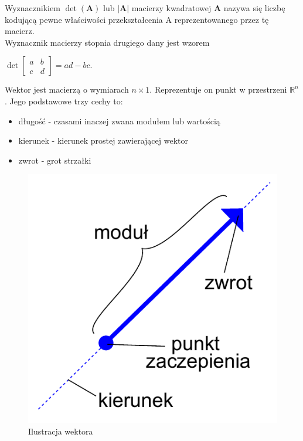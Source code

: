\documentclass[a4paper,12pt,oneside]{book}
\begin{document}
	Wyznacznikiem $\det(\mathbf {A} )$ lub $|\mathbf {A} |$ macierzy kwadratowej $\mathbf  A$ nazywa się liczbę kodującą pewne właściwości przekształcenia $\mathrm {A}$ reprezentowanego przez tę macierz. \\
	
	Wyznacznik macierzy stopnia drugiego dany jest wzorem
	\begin{center}
			${\displaystyle \det {\begin{bmatrix}a&b\\c&d\end{bmatrix}}=ad-bc.}$\\
	\end{center}

	
	
	Wektor jest macierzą o wymiarach $n\times 1$. Reprezentuje on punkt w przestrzeni $\mathbb{R}^n$. Jego podstawowe trzy cechy to:
	\begin{itemize}
		\item długość - czasami inaczej zwana modułem lub wartością
		\item kierunek - kierunek prostej zawierającej wektor
		\item zwrot - grot strzałki
	\end{itemize}

	\begin{figure}[h!]
		\centering\includegraphics[scale=0.7]{Wektor_by_Zureks.pdf}
		\caption{Ilustracja wektora}
	\end{figure}
\end{document}
